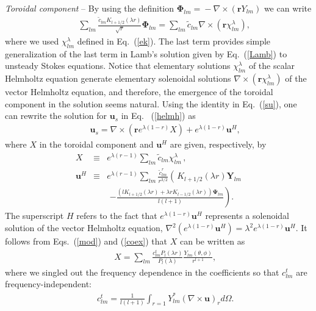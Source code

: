 \documentclass[aps,prx,twocolumn,amsmath,amssymb,amsfonts]{revtex4-2}
\begin{document}
\textit{Toroidal component} -- By using the definition $\bm \Phi_{lm}\!=\!-\nabla\!\times\! (\bm r Y_{lm})$ we can write
\begin{eqnarray}&&\!\!\!\!\!\!\!\!
\sum_{lm} \!\frac{{\tilde c}_{lm} K_{l+1/2}(\lambda r)}{\sqrt{r}}\bm \Phi_{lm}\!=\!\sum_{lm}\! {\tilde c}_{lm}\nabla\!\times \!(\bm r\chi^{\lambda}_{lm}),\
\end{eqnarray}
where we used $\chi^{\lambda}_{lm}$ defined in Eq.~(\ref{ek}). The last term provides simple generalization of the last term in Lamb's solution given by Eq.~(\ref{Lamb}) to unsteady Stokes equations. Notice that elementary solutions $\chi^{\lambda}_{lm}$ of the scalar Helmholtz equation generate elementary solenoidal solutions $\nabla\!\times \!(\bm r\chi^{\lambda}_{lm})$ of the vector Helmholtz equation, and therefore, the emergence of the toroidal component in the solution seems natural. Using the identity in Eq.~(\ref{su}), one can rewrite the solution for $\bm u_s$ in Eq.~ (\ref{helmh}) as
\begin{eqnarray}&&
\bm u_s\!=\!\nabla\times (\bm r e^{\lambda (1-r)}X )+e^{\lambda (1-r)} \bm u^H, \label{totr}
\end{eqnarray}
where $X$ in the toroidal component and $\bm u^H$ are given, respectively, by
\begin{eqnarray}
X & \equiv & e^{\lambda  (r-1)}  \sum_{lm}{\tilde c}_{lm} \chi^{\lambda}_{lm}\,, \nonumber\\
\bm u^H & \equiv & e^{\lambda  (r-1)}\sum_{lm}\frac{{\tilde c}^{r}_{lm}}{r^{3/2}}\left(\frac{}{}K_{l+1/2}(\lambda r)\bm Y_{lm}\!\right. \nonumber\\
&& \,\,\left.-\frac{\left(l K_{l+1/2}(\lambda r)+\lambda rK_{l-1/2}(\lambda r)\right) \bm \Psi_{lm}}{l(l+1)}\right).
\end{eqnarray}
The superscript $H$ refers to the fact that $e^{\lambda (1-r)}\bm u^H$ represents a solenoidal solution of the vector Helmholtz equation, $ \nabla^2\left(e^{\lambda (1-r)} \bm u^H\right)=\lambda^2 e^{\lambda (1-r)}\bm u^H$. It follows from Eqs.~(\ref{mod}) and (\ref{coex}) that $X$ can be written as
\begin{eqnarray}&&\!\!\!\!\!\!\!\!\!\!\!\!
X\!=\!
\sum_{lm}\frac{c^t_{lm}P_{l}\left(\lambda r\right)}{P_l(\lambda)}  \frac{Y_{lm}(\theta, \phi)}{r^{l+1}}, \label{X}
\end{eqnarray}
where we singled out the frequency dependence in the coefficients so that $c^t_{lm}$ are frequency-independent:
\begin{eqnarray}&&\!\!\!\!\!\!\!\!\!\!\!\!
c^t_{lm}\!=\!\frac{1}{l(l+1)}\int_{r=1} Y_{lm}^* (\nabla\!\times\! \bm u)_r   d\Omega. \label{cdo}
\end{eqnarray}
\end{document}
